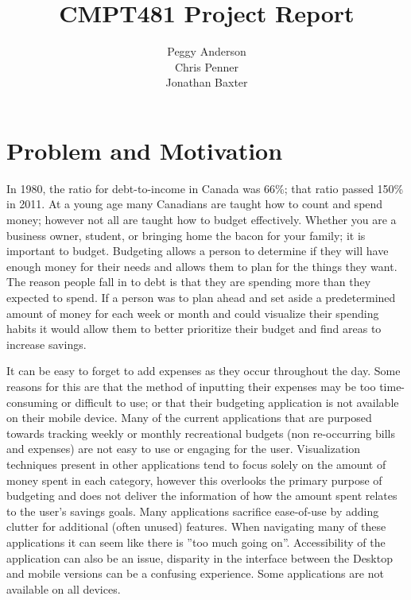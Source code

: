 \documentclass{chi2011}
\begin{document}
\setlength{\paperheight}{11in}
\setlength{\paperwidth}{8.5in}
\setlength{\pdfpageheight}{\paperheight}
\setlength{\pdfpagewidth}{\paperwidth}


\title{CMPT481 Project Report}
\author{
\alignauthor Peggy Anderson\\
    \alignauthor Chris Penner\\
    \alignauthor Jonathan Baxter\\
}

\maketitle

\section{Problem and Motivation}

In 1980, the ratio for debt-to-income in Canada was 66\%; that ratio passed
150\% in 2011. 
At a young age many Canadians are
taught how to count and spend money; however not all are taught how to budget
effectively. Whether you are a business owner, student, or bringing home the
bacon for your family; it is important to budget. Budgeting allows a person to
determine if they will have enough money for their needs and allows them to
plan for the things they want. The reason people fall in to debt is that they
are spending more than they expected to spend. If a person was to plan ahead
and set aside a predetermined amount of money for each week or month and could
visualize their spending habits it would allow them to better prioritize their
budget and find areas to increase savings.

It can be easy to forget to add expenses as they occur throughout the day.
Some reasons for this are that the method of inputting their expenses may be
too time-consuming or difficult to use; or that their budgeting application is
not available on their mobile device. Many of the current applications that
are purposed towards tracking weekly or monthly recreational budgets (non
re-occurring bills and expenses) are not easy to use or engaging for the user.
Visualization techniques present in other applications tend to focus solely
on the amount of money spent in each category, however this overlooks the
primary purpose of budgeting and does not deliver the information of how the
amount spent relates to the user's savings goals. Many applications sacrifice
ease-of-use by adding clutter for additional (often unused) features. When
navigating many of these applications it can seem like there is ”too much
going on”. Accessibility of the application can also be an issue, disparity
in the interface between the Desktop and mobile versions can be a confusing
experience. Some applications are not available on all devices.
\end{document}
